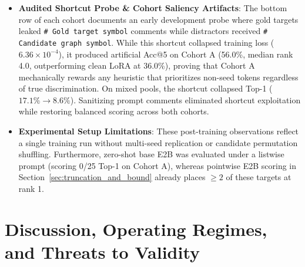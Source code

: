\documentclass[10pt]{article}
\begin{document}
\begin{itemize}[noitemsep,topsep=1pt,parsep=0pt,partopsep=0pt]
    \item \textbf{Audited Shortcut Probe \& Cohort Saliency Artifacts}: The bottom row of each cohort documents an early development probe where gold targets leaked \texttt{\# Gold target symbol} comments while distractors received \texttt{\# Candidate graph symbol}. While this shortcut collapsed training loss ($6.36 \times 10^{-4}$), it produced artificial Acc@5 on Cohort A (56.0\%, median rank 4.0, outperforming clean LoRA at 36.0\%), proving that Cohort A mechanically rewards any heuristic that prioritizes non-seed tokens regardless of true discrimination. On mixed pools, the shortcut collapsed Top-1 ($17.1\% \to 8.6\%$). Sanitizing prompt comments eliminated shortcut exploitation while restoring balanced scoring across both cohorts.
    \item \textbf{Experimental Setup Limitations}: These post-training observations reflect a single training run without multi-seed replication or candidate permutation shuffling. Furthermore, zero-shot base E2B was evaluated under a listwise prompt (scoring 0/25 Top-1 on Cohort A), whereas pointwise E2B scoring in Section~\ref{sec:truncation_and_bound} already places $\ge 2$ of these targets at rank 1.
\end{itemize}
\section{Discussion, Operating Regimes, and Threats to Validity}
\label{sec:discussion}
\end{document}
